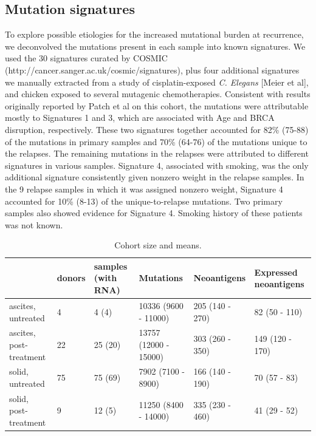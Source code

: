 \subsection*{Mutation signatures}
To explore possible etiologies for the increased mutational burden at recurrence, we deconvolved the mutations present in each sample into known signatures. We used the 30 signatures curated by COSMIC (http://cancer.sanger.ac.uk/cosmic/signatures), plus four additional signatures we manually extracted from a study of cisplatin-exposed \textit{C. Elegans} [Meier et al], and chicken exposed to several mutagenic chemotherapies. Consistent with results originally reported by Patch et al on this cohort, the mutations were attributable mostly to Signatures 1 and 3, which are associated with Age and BRCA disruption, respectively. These two signatures together accounted for 82\% (75-88) of the mutations in primary samples and 70\% (64-76) of the mutations unique to the relapses. The remaining mutations in the relapses were attributed to different signatures in various samples. Signature 4, associated with smoking, was the only additional signature consistently given nonzero weight in the relapse samples. In the 9 relapse samples in which it was assigned nonzero weight, Signature 4 accounted for 10\% (8-13) of the unique-to-relapse mutations. Two primary samples also showed evidence for Signature 4. Smoking history of these patients was not known.



\begin{table}
\begin{tabular}{llllll}
\toprule
{} & donors & samples (with RNA) &              Mutations &      Neoantigens & Expressed neoantigens \\
\midrule
ascites, untreated      &      4 &              4 (4) &   10336 (9600 - 11000) &  205 (140 - 270) &         82 (50 - 110) \\
ascites, post-treatment &     22 &            25 (20) &  13757 (12000 - 15000) &  303 (260 - 350) &       149 (120 - 170) \\
solid, untreated        &     75 &            75 (69) &     7902 (7100 - 8900) &  166 (140 - 190) &          70 (57 - 83) \\
solid, post-treatment   &      9 &             12 (5) &   11250 (8400 - 14000) &  335 (230 - 460) &          41 (29 - 52) \\
\bottomrule
\end{tabular}

\caption{Cohort size and means.}
\label{tab:cohort}
\end{table}

